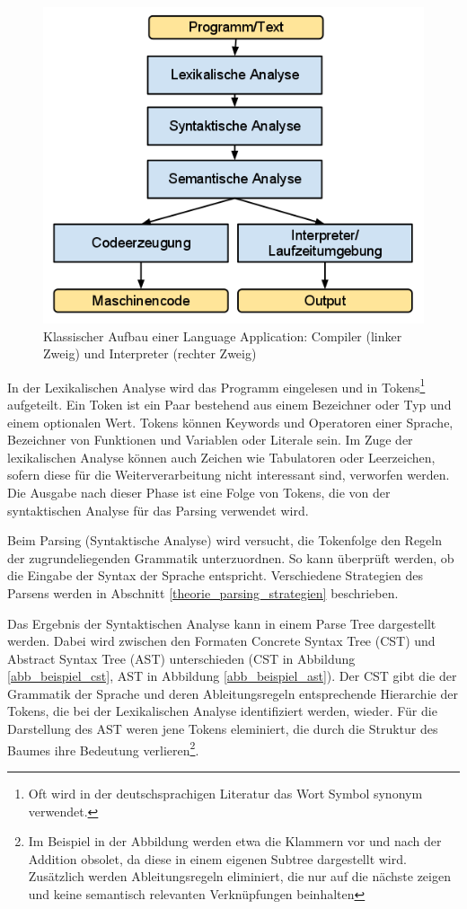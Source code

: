 \begin{figure}[h]
\includegraphics[width=\textwidth,scale=0.5]{figures/language_application_klassisch.png}
\caption{Klassischer Aufbau einer Language Application: Compiler (linker Zweig) und Interpreter (rechter Zweig)}
\label{abb_language_application_klassisch}
\end{figure}

In der Lexikalischen Analyse wird das Programm eingelesen und in Tokens\footnote{Oft wird in der deutschsprachigen Literatur das Wort Symbol synonym verwendet.} aufgeteilt. Ein Token ist ein Paar bestehend aus einem Bezeichner oder Typ und einem optionalen Wert\cite[S. 111ff]{AhSe86}. Tokens können Keywords und Operatoren einer Sprache, Bezeichner von Funktionen und Variablen oder Literale sein. Im Zuge der lexikalischen Analyse können auch Zeichen wie Tabulatoren oder Leerzeichen, sofern diese für die Weiterverarbeitung nicht interessant sind, verworfen werden. Die Ausgabe nach dieser Phase ist eine Folge von Tokens, die von der syntaktischen Analyse für das Parsing verwendet wird.

Beim Parsing (Syntaktische Analyse) wird versucht, die Tokenfolge den Regeln der zugrundeliegenden Grammatik unterzuordnen. So kann überprüft werden, ob die Eingabe der Syntax der Sprache entspricht. Verschiedene Strategien des Parsens werden in Abschnitt \ref{theorie_parsing_strategien} beschrieben. 

Das Ergebnis der Syntaktischen Analyse kann in einem Parse Tree dargestellt werden. Dabei wird zwischen den Formaten Concrete Syntax Tree (CST) und Abstract Syntax Tree (AST) unterschieden (CST in Abbildung \ref{abb_beispiel_cst}, AST in Abbildung \ref{abb_beispiel_ast}). Der CST gibt die der Grammatik der Sprache und deren Ableitungsregeln ent\-sprech\-ende Hierarchie der Tokens, die bei der Lexikalischen Analyse identifiziert werden, wieder. Für die Darstellung des AST weren jene Tokens eleminiert, die durch die Struktur des Baumes ihre Bedeutung verlieren\footnote{Im Beispiel in der Abbildung werden etwa die Klammern vor und nach der Addition obsolet, da diese in einem eigenen Subtree dargestellt wird. Zusätzlich werden Ableitungsregeln eliminiert, die nur auf die nächste zeigen und keine semantisch relevanten Verknüpfungen beinhalten}.  

